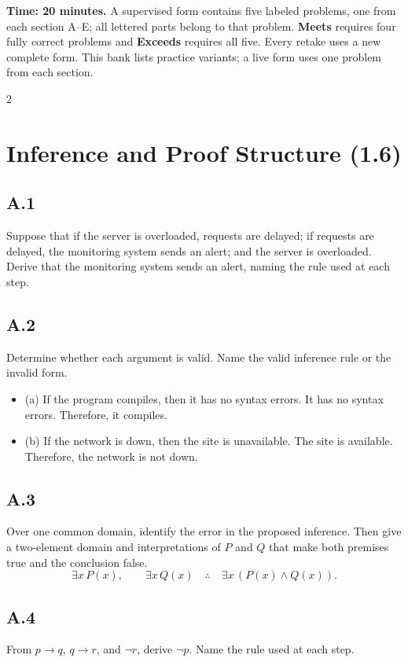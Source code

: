 \documentclass{article}
\begin{document}
\textbf{Time: 20 minutes.} A supervised form contains five labeled problems,
one from each section A--E; all lettered parts belong to that problem.
\textbf{Meets} requires four fully correct problems and \textbf{Exceeds}
requires all five. Every retake uses a new complete form. This bank lists
practice variants; a live form uses one problem from each section.

\begin{multicols}{2}

\section*{Inference and Proof Structure (1.6)}

\subsection*{A.1}
Suppose that if the server is overloaded, requests are delayed; if requests are
delayed, the monitoring system sends an alert; and the server is overloaded.
Derive that the monitoring system sends an alert, naming the rule used at each
step.

\subsection*{A.2}
Determine whether each argument is valid. Name the valid inference rule or the invalid form.
\begin{itemize}
  \item (a) If the program compiles, then it has no syntax errors. It has no syntax errors. Therefore, it compiles.
  \item (b) If the network is down, then the site is unavailable. The site is
        available. Therefore, the network is not down.
\end{itemize}

\subsection*{A.3}
Over one common domain, identify the error in the proposed inference. Then give
a two-element domain and interpretations of $P$ and $Q$ that make both premises
true and the conclusion false.
\[
\exists x\,P(x),\qquad \exists x\,Q(x)
\quad\therefore\quad
\exists x\,(P(x)\land Q(x)).
\]

\subsection*{A.4}
From $p\to q$, $q\to r$, and $\neg r$, derive $\neg p$. Name the rule used at
each step.


\end{multicols}
\end{document}
